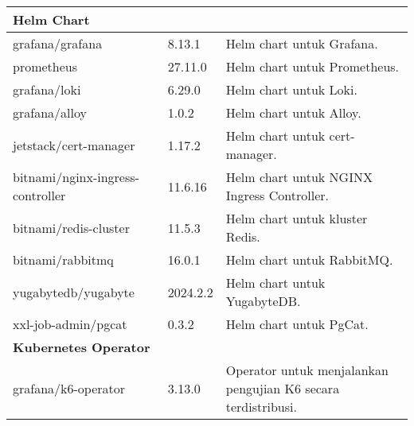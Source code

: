 \begin{longtable}{|p{}|p{}|p{}|}
    \multicolumn{3}{|l|}{\textbf{Helm Chart}} \\
    \hline
    grafana/grafana & 8.13.1 & Helm chart untuk Grafana. \\
    prometheus & 27.11.0 & Helm chart untuk Prometheus. \\
    grafana/loki & 6.29.0 & Helm chart untuk Loki. \\
    grafana/alloy & 1.0.2 & Helm chart untuk Alloy. \\
    jetstack/cert-manager & 1.17.2 & Helm chart untuk cert-manager. \\
    bitnami/nginx-ingress-controller & 11.6.16 & Helm chart untuk NGINX Ingress Controller. \\
    bitnami/redis-cluster & 11.5.3 & Helm chart untuk kluster Redis. \\
    bitnami/rabbitmq & 16.0.1 & Helm chart untuk RabbitMQ. \\
    yugabytedb/yugabyte & 2024.2.2 & Helm chart untuk YugabyteDB. \\
    xxl-job-admin/pgcat & 0.3.2 & Helm chart untuk PgCat. \\
    \hline
    
    \multicolumn{3}{|l|}{\textbf{Kubernetes Operator}} \\
    \hline
    grafana/k6-operator & 3.13.0 & Operator untuk menjalankan pengujian K6 secara terdistribusi. \\

\end{longtable}
\endgroup